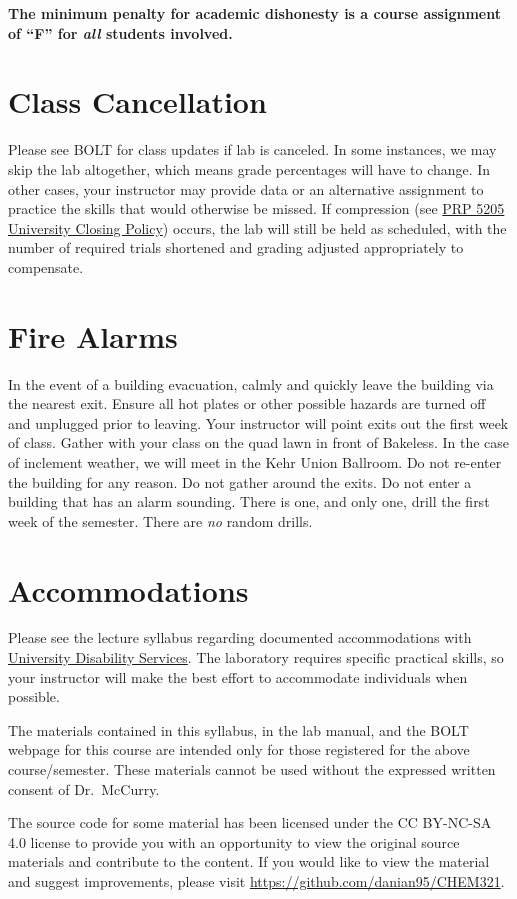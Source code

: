 \documentclass[11pt,letterpaper]{article}
\begin{document}
\begin{mdframed}
	\centering\bfseries The minimum penalty for academic dishonesty is a
	course assignment of ``F'' for \emph{all} students involved.
\end{mdframed}

\section{Class Cancellation}
Please see BOLT for class updates if lab is canceled. In some instances, we may
skip the lab altogether, which means grade percentages will have to change. In
other cases, your instructor may provide data or an alternative assignment to
practice the skills that would otherwise be missed. If compression (see
\href{https://www.bloomu.edu/documents/prp5205}{PRP 5205 University Closing
Policy}) occurs, the lab will still be held as scheduled, with the number of
required trials shortened and grading adjusted appropriately to compensate.

\section{Fire Alarms}
In the event of a building evacuation, calmly and quickly leave the building via
the nearest exit. Ensure all
hot plates or other possible hazards are turned off and unplugged prior to
leaving. Your instructor will point exits out the first week of class.  Gather
with your class on the quad lawn in front of Bakeless. In the case of inclement
weather, we will meet in the Kehr Union Ballroom. Do not re-enter the
building for any reason. Do not gather around the exits. Do not enter a
building that has an alarm sounding. There is one, and only one, drill the first
week of the semester. There are \emph{no} random drills.

\section{Accommodations}
Please see the lecture syllabus regarding documented accommodations with 
\href{https://bloomu.prod.acquia-sites.com/offices-directory/disability-services}{University
Disability Services}. The laboratory requires specific practical skills, so your
instructor will make the best effort to accommodate individuals when possible.

\vfill

\begin{mdframed}
	\noindent
	The materials contained in this syllabus, in the lab manual, and the
	BOLT webpage for this course are intended only for those registered for
	the above course/semester. These materials cannot be used without the
	expressed written consent of Dr.\ McCurry.

	\bigskip

	\noindent
	The source code for some material has been licensed under the CC
	BY-NC-SA 4.0 license to provide you with an opportunity to view the
	original source materials and contribute to the content. If you would
	like to view the material and suggest improvements, please visit
	\url{https://github.com/danian95/CHEM321}.
\end{mdframed}
\end{document}
